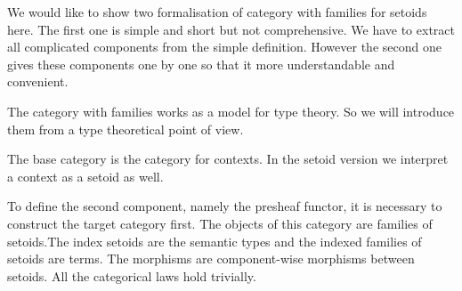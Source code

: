 We would like to show two formalisation of category with families for setoids here. The first one is simple and short but not comprehensive. We have to extract all complicated components from the simple definition. However the second one gives these components one by one so that it more understandable and convenient.

The category with families works as a model for type theory. So we will introduce them from a type theoretical point of view.

The base category is the category for contexts. In the setoid version we interpret a context as a setoid as well.

To define the second component, namely the presheaf functor, it is necessary to construct the target category first. The objects of this category are families of setoids.The index setoids are the semantic types and the indexed families of setoids are terms. The morphisms are component-wise morphisms between setoids. All the categorical laws hold trivially.

